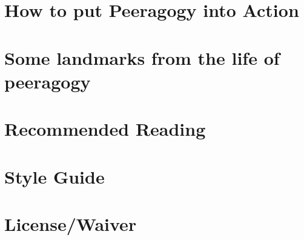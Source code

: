 \documentclass[ebook, 12pt, twoside]{memoir}
\let\sc\scshape
\let\sc\scshape
\begin{document}
\chapter[\textbf{How to put Peeragogy into Action}]{How to put Peeragogy into Action}
%

%
\chapter[\textbf{Some landmarks from the life of peeragogy}]{Some landmarks from the life of peeragogy}

%
\chapter[\textbf{Recommended Reading}]{Recommended Reading}
%

%
\chapter[\textbf{Style Guide}]{Style Guide}
%

%
%
%



\newpage
\chapter[\textbf{License/Waiver}]{License/Waiver}

%
\pagestyle{empty} \thispagestyle{empty}
\clearpage\mbox{}\clearpage\mbox{}\clearpage    %
\end{document}
